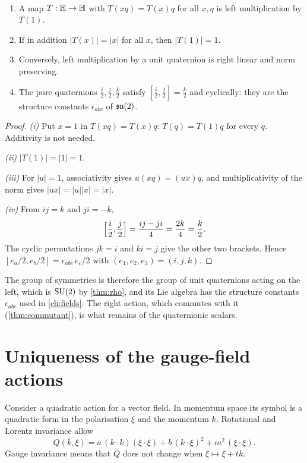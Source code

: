 \begin{proposition}\label{prop:gaugegroup}\ver\
\begin{enumerate}[label=(\roman*)]
\item A map $T:\mathbb{H}\to\mathbb{H}$ with $T(xq)=T(x)q$ for all $x,q$ is left multiplication by $T(1)$.
\item If in addition $|T(x)|=|x|$ for all $x$, then $|T(1)|=1$.
\item Conversely, left multiplication by a unit quaternion is right linear and norm preserving.
\item The pure quaternions $\frac i2,\frac j2,\frac k2$ satisfy $[\tfrac i2,\tfrac j2]=\tfrac k2$ and cyclically: they are the structure constants $\epsilon_{abc}$ of $\mathfrak{su}(2)$.
\end{enumerate}
\end{proposition}
\begin{proof}
\emph{(i)} Put $x=1$ in $T(xq)=T(x)q$: $T(q)=T(1)q$ for every $q$. Additivity is not needed.

\emph{(ii)} $|T(1)|=|1|=1$.

\emph{(iii)} For $|u|=1$, associativity gives $u(xq)=(ux)q$, and multiplicativity of the norm gives $|ux|=|u||x|=|x|$.

\emph{(iv)} From $ij=k$ and $ji=-k$,
\[
\Bigl[\frac i2,\frac j2\Bigr]=\frac{ij-ji}4=\frac{2k}4=\frac k2 .
\]
The cyclic permutations $jk=i$ and $ki=j$ give the other two brackets. Hence $[e_a/2,e_b/2]=\epsilon_{abc}\,e_c/2$ with $(e_1,e_2,e_3)=(i,j,k)$.
\end{proof}


The group of symmetries is therefore the group of unit quaternions acting on the left, which is $\mathrm{SU}(2)$ by \cref{thm:rho}, and its Lie algebra has the structure constants $\epsilon_{abc}$ used in \cref{ch:fields}. The right action, which commutes with it (\cref{thm:commutant}), is what remains of the quaternionic scalars.

\section{Uniqueness of the gauge-field actions}

Consider a quadratic action for a vector field. In momentum space its symbol is a quadratic form in the polarisation $\xi$ and the momentum $k$. Rotational and Lorentz invariance allow
\[
Q(k,\xi)=a\,(k\cdot k)(\xi\cdot\xi)+b\,(k\cdot\xi)^2+m^2\,(\xi\cdot\xi).
\]
Gauge invariance means that $Q$ does not change when $\xi\mapsto\xi+tk$.

